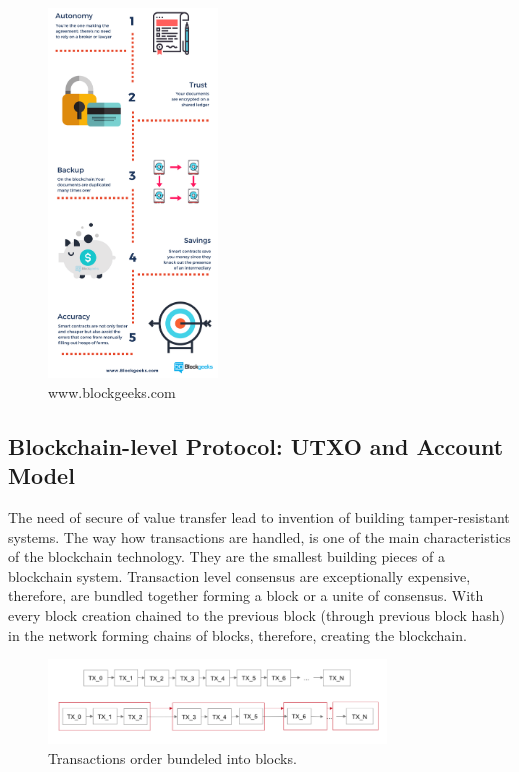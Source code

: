 \begin{figure}[h]
\centering
\includegraphics[width=0.4\textwidth]{images/smartcontracts.png}
\caption{\label{fig:Smartcontracts}www.blockgeeks.com}
\end{figure}




\subsection{Blockchain-level Protocol: UTXO and Account Model}

The need of secure of value transfer lead to invention of building tamper-resistant systems. The way how transactions are handled, is one of the main characteristics of the blockchain technology. They are the smallest building pieces of a blockchain system. Transaction level consensus are exceptionally expensive, therefore, are bundled together forming a block or a unite of consensus. With every block creation chained to the previous block (through previous block hash) in the network forming chains of blocks, therefore, creating the blockchain.


\begin{figure}[h]
\centering
\includegraphics[width=0.8\textwidth]{images/transactions_blocks.png}
\caption{\label{fig:Transactions}Transactions order bundeled into blocks.}
\end{figure}


